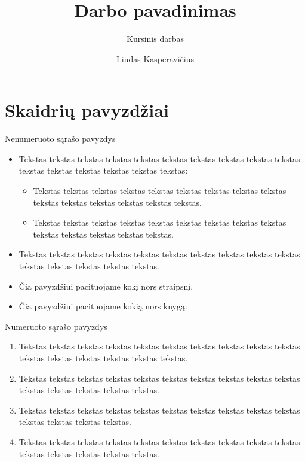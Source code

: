 \documentclass[12pt]{beamer}
\title[]{Darbo pavadinimas}
\subtitle[]{Kursinis darbas}
\author[Liudas Kasperavičius]{Liudas Kasperavičius}
\date{}
\begin{document}
\begin{frame}
    \titlepage
\end{frame}

\section{Skaidrių pavyzdžiai}


\begin{frame}{Nenumeruoto sąrašo pavyzdys}
    \begin{itemize}
    \item Tekstas tekstas tekstas tekstas tekstas tekstas tekstas tekstas tekstas tekstas tekstas tekstas tekstas tekstas tekstas tekstas:
        \begin{itemize}
        \item Tekstas tekstas tekstas tekstas tekstas tekstas tekstas tekstas tekstas tekstas tekstas tekstas tekstas tekstas tekstas.
        \item Tekstas tekstas tekstas tekstas tekstas tekstas tekstas tekstas tekstas tekstas tekstas tekstas tekstas tekstas.
        \end{itemize}
    \item Tekstas tekstas tekstas tekstas tekstas tekstas tekstas tekstas tekstas tekstas tekstas tekstas tekstas tekstas tekstas.
    \item Čia pavyzdžiui pacituojame kokį nors straipsnį\cite{Januschowski_2020}.
    \item Čia pavyzdžiui pacituojame kokią nors knygą\cite{Abraham_2009}.
    \end{itemize}
\end{frame}


\begin{frame}{Numeruoto sąrašo pavyzdys}
    \begin{enumerate}
    \item Tekstas tekstas tekstas tekstas tekstas tekstas tekstas tekstas tekstas tekstas tekstas tekstas tekstas tekstas tekstas tekstas.
    \item Tekstas tekstas tekstas tekstas tekstas tekstas tekstas tekstas tekstas tekstas tekstas tekstas tekstas tekstas tekstas.
    \item Tekstas tekstas tekstas tekstas tekstas tekstas tekstas tekstas tekstas tekstas tekstas tekstas tekstas tekstas.
    \item Tekstas tekstas tekstas tekstas tekstas tekstas tekstas tekstas tekstas tekstas tekstas tekstas tekstas tekstas tekstas.
    \end{enumerate}
\end{frame}
\end{document}
